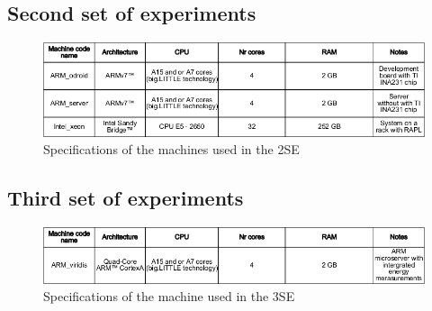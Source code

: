 \subsection{Second set of experiments}


\begin{figure}[h!]
  \centering
    \includegraphics[width=150mm]{"img/2se_specs"}
    \caption{Specifications of the machines used in the 2SE}
    \label{fig:2se_specs}
\end{figure}


\subsection{Third set of experiments}

\begin{figure}[h!]
  \centering
    \includegraphics[width=150mm]{"img/3se_specs"}
    \caption{Specifications of the machine used in the 3SE}
    \label{fig:3se_specs}
\end{figure}




